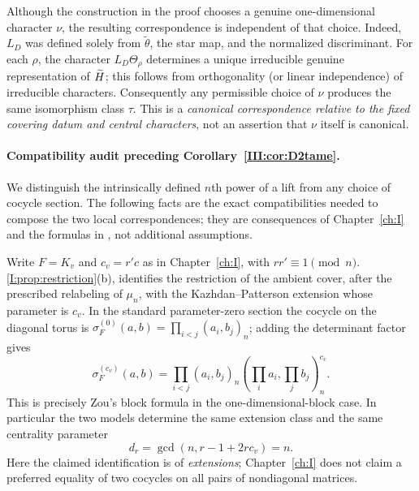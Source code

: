 \begin{remark}
Although the construction in the proof chooses a genuine
one-dimensional character $\nu$, the resulting correspondence is
independent of that choice. Indeed, $L_D$ was defined solely from
$\widetilde\theta$, the star map, and the normalized discriminant.
For each $\rho$, the character $L_D\Theta_\rho$ determines a unique
irreducible genuine representation of $\widetilde H$; this follows from
orthogonality (or linear independence) of irreducible characters.
Consequently any permissible choice of $\nu$ produces the same
isomorphism class $\tau$. This is a \emph{canonical correspondence
relative to the fixed covering datum and central characters}, not
an assertion that $\nu$ itself is canonical.
\end{remark}



\paragraph{Compatibility audit preceding Corollary~\ref{III:cor:D2tame}.}
We distinguish the intrinsically defined $n$th power of a lift from
any choice of cocycle section.  The following facts are the exact
compatibilities needed to compose the two local correspondences;
they are consequences of Chapter~\ref{ch:I} and the formulas in
\cite[\S\S2.2, 3.1]{Zo23}, not additional assumptions.

Write $F=K_v$ and $c_v=r'c$ as in Chapter~\ref{ch:I}, with $rr'\equiv1\pmod n$.
\cref{I:prop:restriction}(b), identifies the restriction of the ambient
cover, after the prescribed relabeling of $\mu_n$, with the
Kazhdan--Patterson extension whose parameter is $c_v$.  In the
standard parameter-zero section the cocycle on the diagonal torus is
$\sigma_F^{(0)}(a,b)=\prod_{i<j}(a_i,b_j)_n$; adding the determinant
factor gives
\begin{equation}\label{III:eq:zou-cocycle-audit}
 \sigma_F^{(c_v)}(a,b)=
 \prod_{i<j}(a_i,b_j)_n
 \left(\prod_i a_i,\prod_j b_j\right)_n^{c_v}.
\end{equation}
This is precisely Zou's block formula \cite[(2.1)]{Zo23} in the
one-dimensional-block case.  In particular the two models determine
the same extension class and the same centrality parameter
\[
 d_r=\gcd(n,r-1+2rc_v)=n.
\]
Here the claimed identification is of \emph{extensions}; Chapter~\ref{ch:I} does
not claim a preferred equality of two cocycles on all pairs of
nondiagonal matrices.

